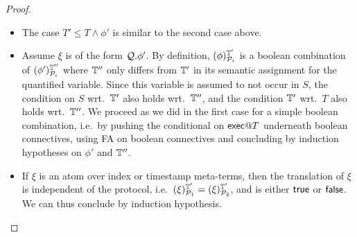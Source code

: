 \begin{proof}
\begin{itemize}
   \item
     The case $T' \leq T \wedge \phi'$ is similar to the
     second case above.
     
   \item Assume $\xi$ is of the form ${\cal Q}.\phi'$.
     By definition, $(\phi)^{\mathbb{T}'}_{\mathcal{P}_i}$
     is a boolean combination
     of $(\phi')^{\mathbb{T}''}_{\mathcal{P}_i}$
     where $\mathbb{T}''$ only differs from $\mathbb{T}'$ in its semantic assignment
     for the quantified variable.
     Since this variable is assumed to not occur in $S$,
     the condition on $S$ wrt.\ $\mathbb{T}'$ also holds wrt.\ $\mathbb{T}''$,
     and the condition $\mathbb{T}'$ wrt.\ $T$ also holds wrt.\ $\mathbb{T}''$.
     We proceed as we did in the first case for a simple boolean combination,
     i.e.\ by pushing the conditional on $\textsf{exec} @ T$ underneath boolean
     connectives, using \textsc{FA} on boolean connectives and concluding
     by induction hypotheses on $\phi'$ and $\mathbb{T}''$.
     
   \item If $\xi$ is an atom over index or timestamp meta-terms,
     then the translation of $\xi$ is independent of the protocol, i.e.\ $(\xi)^{\mathbb{T}'}_{\mathcal{P}_1} = (\xi)^{\mathbb{T}'}_{\mathcal{P}_2}$, and is either $\textsf{true}$ or $\textsf{false}$. We can thus conclude
     by induction hypothesis.
     
     

\end{itemize}
\end{proof}
